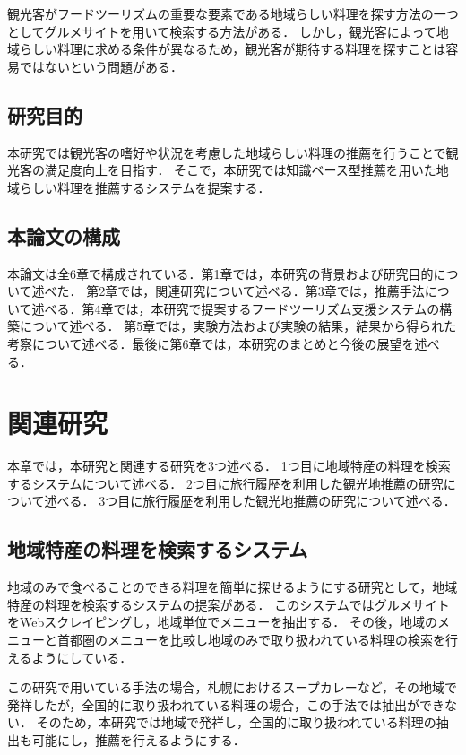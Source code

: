 \documentclass{funthesis}
\begin{document}
観光客がフードツーリズムの重要な要素である地域らしい料理を探す方法の一つとしてグルメサイトを用いて検索する方法がある．
しかし，観光客によって地域らしい料理に求める条件が異なるため，観光客が期待する料理を探すことは容易ではないという問題がある．

\section{研究目的}  
本研究では観光客の嗜好や状況を考慮した地域らしい料理の推薦を行うことで観光客の満足度向上を目指す．
そこで，本研究では知識ベース型推薦を用いた地域らしい料理を推薦するシステムを提案する．

\section{本論文の構成}
本論文は全6章で構成されている．第1章では，本研究の背景および研究目的について述べた．
第2章では，関連研究について述べる．第3章では，推薦手法について述べる．第4章では，本研究で提案するフードツーリズム支援システムの構築について述べる．
第5章では，実験方法および実験の結果，結果から得られた考察について述べる．最後に第6章では，本研究のまとめと今後の展望を述べる．


\chapter{関連研究}
本章では，本研究と関連する研究を3つ述べる．
1つ目に地域特産の料理を検索するシステムについて述べる．
2つ目に旅行履歴を利用した観光地推薦の研究について述べる．
3つ目に旅行履歴を利用した観光地推薦の研究について述べる．

\section{地域特産の料理を検索するシステム}
地域のみで食べることのできる料理を簡単に探せるようにする研究として，地域特産の料理を検索するシステムの提案がある\cite{6}．
このシステムではグルメサイトをWebスクレイピングし，地域単位でメニューを抽出する．
その後，地域のメニューと首都圏のメニューを比較し地域のみで取り扱われている料理の検索を行えるようにしている．

この研究で用いている手法の場合，札幌におけるスープカレーなど，その地域で発祥したが，全国的に取り扱われている料理の場合，この手法では抽出ができない．
そのため，本研究では地域で発祥し，全国的に取り扱われている料理の抽出も可能にし，推薦を行えるようにする．
\end{document}
